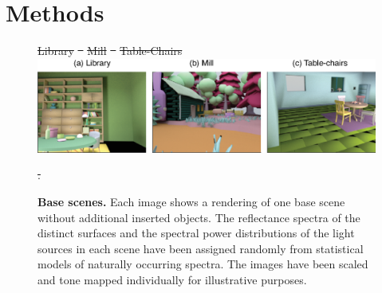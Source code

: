 \documentclass{jov}
\providecommand{\DIFdeltex}[1]{{\protect\color{red}\sout{#1}}}                      %
\providecommand{\DIFdelFL}[1]{\DIFdel{#1}} %
\providecommand{\DIFaddbeginFL}{} %
\providecommand{\DIFaddendFL}{} %
\providecommand{\DIFdelbeginFL}{} %
\providecommand{\DIFdelendFL}{} %
\providecommand{\DIFdel}[1]{\texorpdfstring{\DIFdeltex{#1}}{}} %
\newcommand{\DIFscaledelfig}{0.5}
\newlength{\DIFdelgraphicswidth} %
\newlength{\DIFdelgraphicsheight} %
\newcommand{\DIFaddincludegraphics}[2][]{{\color{blue}\fbox{\DIFOincludegraphics[#1]{#2}}}} %
\newcommand{\DIFdelincludegraphics}[2][]{%
\sbox{\DIFdelgraphicsbox}{\DIFOincludegraphics[#1]{#2}}%
\settoboxwidth{\DIFdelgraphicswidth}{\DIFdelgraphicsbox} %
\settoboxtotalheight{\DIFdelgraphicsheight}{\DIFdelgraphicsbox} %
\scalebox{\DIFscaledelfig}{%
\parbox[b]{\DIFdelgraphicswidth}{\usebox{\DIFdelgraphicsbox}\\[-\baselineskip] \rule{\DIFdelgraphicswidth}{0em}}\llap{\resizebox{\DIFdelgraphicswidth}{\DIFdelgraphicsheight}{%
\setlength{\unitlength}{\DIFdelgraphicswidth}%
\begin{picture}(1,1)%
\thicklines\linethickness{2pt} %
{\color[rgb]{1,0,0}\put(0,0){\framebox(1,1){}}}%
{\color[rgb]{1,0,0}\put(0,0){\line( 1,1){1}}}%
{\color[rgb]{1,0,0}\put(0,1){\line(1,-1){1}}}%
\end{picture}%
}\hspace*{3pt}}} %
} %
\DeclareRobustCommand{\DIFaddbeginFL}{\DIFOaddbeginFL \let\includegraphics\DIFaddincludegraphics} %
\DeclareRobustCommand{\DIFaddendFL}{\DIFOaddendFL \let\includegraphics\DIFOincludegraphics} %
\DeclareRobustCommand{\DIFdelbeginFL}{\DIFOdelbeginFL \let\includegraphics\DIFdelincludegraphics} %
\DeclareRobustCommand{\DIFdelendFL}{\DIFOaddendFL \let\includegraphics\DIFOincludegraphics} %
\begin{document}
\section*{Methods} \label{Methods}
\begin{figure}
\centering
\DIFdelbeginFL %
{%
\DIFdelFL{Library }}
\DIFdelFL{~
    }%
{%
\DIFdelFL{Mill}}    
\DIFdelFL{~
    }%
{%
\DIFdelFL{Table-Chairs}}    
\DIFdelendFL \DIFaddbeginFL \includegraphics{Figure2.eps}
    \DIFaddendFL \caption{{\bf Base scenes.} Each image shows a rendering of one base scene without additional inserted objects.  The reflectance spectra of the distinct surfaces and the spectral power distributions of the light sources in each scene have been assigned randomly from statistical models of naturally occurring spectra. The images have been scaled and tone mapped individually for illustrative purposes.}
\label{fig:baseScenes}
\DIFdelbeginFL \DIFdelFL{. }\DIFdelendFL \end{figure}
\end{document}
